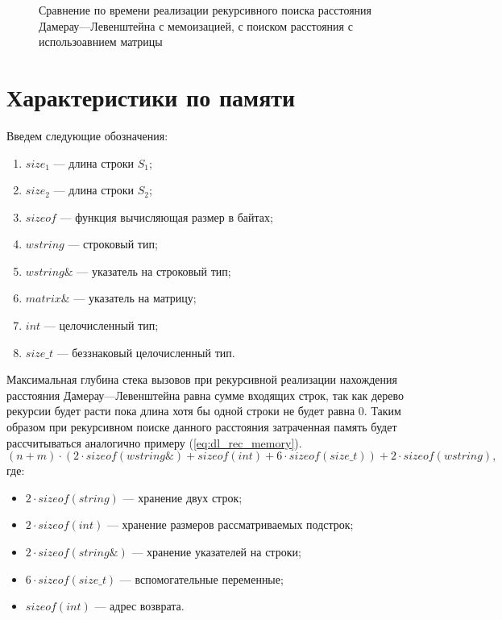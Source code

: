 \begin{figure}[H]
	\centering
	
	\caption{Сравнение по времени реализации рекурсивного поиска расстояния Дамерау---Левенштейна с  мемоизацией, с поиском
	расстояния с использоавнием матрицы}
	\label{plt:time_mat_rec_cmp}
\end{figure}


\section{Характеристики по памяти}

Введем следующие обозначения:
\begin{enumerate}
	\item $size_{1}$ --- длина строки $S_{1}$;
	\item $size_{2}$ --- длина строки $S_{2}$;
	\item $sizeof$ --- функция вычисляющая размер в байтах;
	\item $wstring$ --- строковый тип;
	\item $wstring\&$ --- указатель на строковый тип;
	\item $matrix\&$ --- указатель на матрицу;
	\item $int$ --- целочисленный тип;
	\item $size\_t$ --- беззнаковый целочисленный тип.
\end{enumerate}

Максимальная глубина стека вызовов при рекурсивной реализации нахождения расстояния Дамерау---Левенштейна равна сумме входящих строк,
так как дерево рекурсии будет расти пока длина хотя бы одной строки не будет равна 0. Таким образом при рекурсивном поиске данного расстояния затраченная память
будет рассчитываться  аналогично примеру (\ref{eq:dl_rec_memory}).
\begin{equation}
	\label{eq:dl_rec_memory}
	(n + m) \cdot (2 \cdot sizeof(wstring\&) + sizeof(int) + 6 \cdot sizeof(size\_t)) + 2 \cdot sizeof(wstring),
\end{equation}
где:
\begin{itemize}
	\item $2 \cdot sizeof(string)$ --- хранение двух строк;
	\item $2 \cdot sizeof(int)$ --- хранение размеров рассматриваемых подстрок;
	\item $2 \cdot sizeof(string\&)$ --- хранение указателей на строки;
	\item $6 \cdot sizeof(size\_t)$ --- вспомогательные переменные;
	\item $sizeof(int)$ --- адрес возврата.
\end{itemize}

